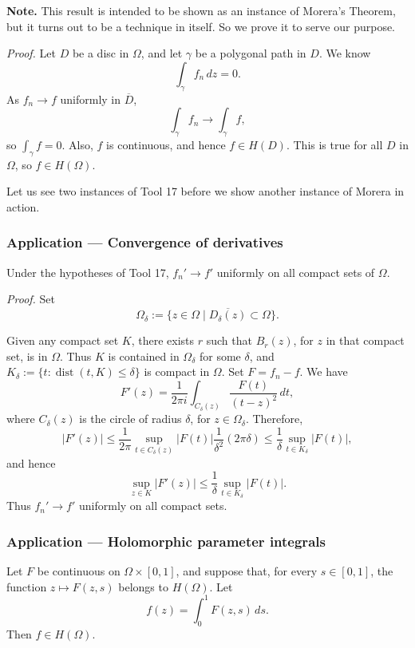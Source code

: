 \documentclass[11pt,a4paper]{article}
\begin{document}

\textbf{Note.}
This result is intended to be shown as an instance of Morera's Theorem, but it turns out to be a technique in itself. So we prove it to serve our purpose.

\textit{Proof.}
Let $D$ be a disc in $\Omega$, and let $\gamma$ be a polygonal path in $D$.
We know
\[
  \int_\gamma f_n\,dz=0.
\]
As $f_n\to f$ uniformly in $\overline D$,
\[
  \int_\gamma f_n\to\int_\gamma f,
\]
so $\int_\gamma f=0$. Also, $f$ is continuous, and hence $f\in H(D)$. This is
true for all $D$ in $\Omega$, so $f\in H(\Omega)$.

Let us see two instances of Tool 17 before we show another instance of Morera in action.

\subsubsection*{Application — Convergence of derivatives}
Under the hypotheses of Tool 17, \(f_n'\to f'\)
uniformly on all compact sets of $\Omega$.

\textit{Proof.}
Set
\[
  \Omega_\delta
  :=\bigl\{z\in\Omega\mid \overline{D_\delta(z)}\subset\Omega\bigr\}.
\]


Given any compact set $K$, there exists $r$ such that $B_r(z)$, for $z$ in that
compact set, is in $\Omega$. Thus $K$ is contained in
$\Omega_\delta$ for some $\delta$, and
$K_\delta:=\{t:\operatorname{dist}(t,K)\leq\delta\}$ is compact in $\Omega$.
Set $F=f_n-f$. We have
\[
  F'(z)=\frac1{2\pi i}\int_{C_\delta(z)}\frac{F(t)}{(t-z)^2}\,dt,
\]
where $C_\delta(z)$ is the circle of radius $\delta$, for $z\in\Omega_\delta$.
Therefore,
\[
  |F'(z)|
  \leq\frac1{2\pi}\sup_{t\in C_\delta(z)}|F(t)|\frac1{\delta^2}(2\pi\delta)
  \leq\frac1\delta\sup_{t\in K_\delta}|F(t)|,
\]
and hence
\[
  \sup_{z\in K}|F'(z)|
  \leq\frac1\delta\sup_{t\in K_\delta}|F(t)|.
\]
Thus $f_n'\to f'$ uniformly on all compact sets.

\subsubsection*{Application — Holomorphic parameter integrals}
Let $F$ be continuous on $\Omega\times[0,1]$, and
suppose that, for every $s\in[0,1]$, the function $z\mapsto F(z,s)$ belongs to $H(\Omega)$. Let
\[
  f(z)=\int_0^1F(z,s)\,ds.
\]
Then $f\in H(\Omega)$.
\end{document}
